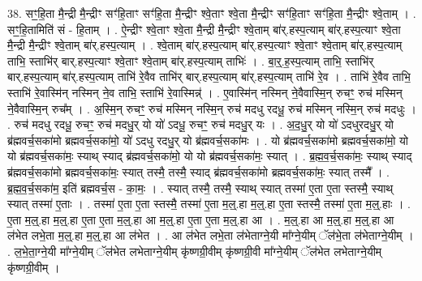\documentclass[17pt]{extarticle}
\begin{document}
38. सꣳ॒॒हि॒ता मै॒न्द्री मै॒न्द्रीꣳ सꣳ॑हि॒ताꣳ सꣳ॑हि॒ता मै॒न्द्रीꣳ श्वे॒ताꣳ श्वे॒ता मै॒न्द्रीꣳ सꣳ॑हि॒ताꣳ सꣳ॑हि॒ता मै॒न्द्रीꣳ श्वे॒ताम् । . सꣳ॒॒हि॒तामिति॑ सं - हि॒ताम् । . ऐ॒न्द्रीꣳ श्वे॒ताꣳ श्वे॒ता मै॒न्द्री मै॒न्द्रीꣳ श्वे॒ताम् बा॑र्.हस्प॒त्याम् बा॑र्.हस्प॒त्याꣳ श्वे॒ता मै॒न्द्री मै॒न्द्रीꣳ श्वे॒ताम् बा॑र्.हस्प॒त्याम् । . श्वे॒ताम् बा॑र्.हस्प॒त्याम् बा॑र्.हस्प॒त्याꣳ श्वे॒ताꣳ श्वे॒ताम् बा॑र्.हस्प॒त्याम् ताभि॒ स्ताभि॑र् बार्.हस्प॒त्याꣳ श्वे॒ताꣳ श्वे॒ताम् बा॑र्.हस्प॒त्याम् ताभिः॑ । . बा॒र्॒.ह॒स्प॒त्याम् ताभि॒ स्ताभि॑र् बार्.हस्प॒त्याम् बा॑र्.हस्प॒त्याम् ताभि॑ रे॒वैव ताभि॑र् बार्.हस्प॒त्याम् बा॑र्.हस्प॒त्याम् ताभि॑ रे॒व । . ताभि॑ रे॒वैव ताभि॒ स्ताभि॑ रे॒वास्मि॑न् नस्मिन् ने॒व ताभि॒ स्ताभि॑ रे॒वास्मिन्न्॑ । . ए॒वास्मि॑न् नस्मिन् ने॒वैवास्मि॒न् रुचꣳ॒॒ रुच॑ मस्मिन् ने॒वैवास्मि॒न् रुच᳚म् । . अ॒स्मि॒न् रुचꣳ॒॒ रुच॑ मस्मिन् नस्मि॒न् रुच॑ मदधु रदधू॒ रुच॑ मस्मिन् नस्मि॒न् रुच॑ मदधुः । . रुच॑ मदधु रदधू॒ रुचꣳ॒॒ रुच॑ मदधु॒र् यो यो॑ ऽदधू॒ रुचꣳ॒॒ रुच॑ मदधु॒र् यः । . अ॒द॒धु॒र् यो यो॑ ऽदधुरदधु॒र् यो ब्र॑ह्मवर्च॒सका॑मो ब्रह्मवर्च॒सका॑मो॒ यो॑ ऽदधु रदधु॒र् यो ब्र॑ह्मवर्च॒सका॑मः । . यो ब्र॑ह्मवर्च॒सका॑मो ब्रह्मवर्च॒सका॑मो॒ यो यो ब्र॑ह्मवर्च॒सका॑मः॒ स्याथ् स्याद् ब्र॑ह्मवर्च॒सका॑मो॒ यो यो ब्र॑ह्मवर्च॒सका॑मः॒ स्यात् । . ब्र॒ह्म॒व॒र्च॒सका॑मः॒ स्याथ् स्याद् ब्र॑ह्मवर्च॒सका॑मो ब्रह्मवर्च॒सका॑मः॒ स्यात् तस्मै॒ तस्मै॒ स्याद् ब्र॑ह्मवर्च॒सका॑मो ब्रह्मवर्च॒सका॑मः॒ स्यात् तस्मै᳚ । . ब्र॒ह्म॒व॒र्च॒सका॑म॒ इति॑ ब्रह्मवर्च॒स - का॒मः॒ । . स्यात् तस्मै॒ तस्मै॒ स्याथ् स्यात् तस्मा॑ ए॒ता ए॒ता स्तस्मै॒ स्याथ् स्यात् तस्मा॑ ए॒ताः । . तस्मा॑ ए॒ता ए॒ता स्तस्मै॒ तस्मा॑ ए॒ता म॒ल्॒.हा म॒ल्॒.हा ए॒ता स्तस्मै॒ तस्मा॑ ए॒ता म॒ल्॒.हाः । . ए॒ता म॒ल्॒.हा म॒ल्॒.हा ए॒ता ए॒ता म॒ल्॒.हा आ म॒ल्॒.हा ए॒ता ए॒ता म॒ल्॒.हा आ । . म॒ल्॒.हा आ म॒ल्॒.हा म॒ल्॒.हा आ ल॑भेत लभे॒ता म॒ल्॒.हा म॒ल्॒.हा आ ल॑भेत । . आ ल॑भेत लभे॒ता ल॑भेताग्ने॒यी मा᳚ग्ने॒यीम् ॅल॑भे॒ता ल॑भेताग्ने॒यीम् । . ल॒भे॒ता॒ग्ने॒यी मा᳚ग्ने॒यीम् ॅल॑भेत लभेताग्ने॒यीम् कृ॑ष्णग्री॒वीम् कृ॑ष्णग्री॒वी मा᳚ग्ने॒यीम् ॅल॑भेत लभेताग्ने॒यीम् कृ॑ष्णग्री॒वीम् । \newline
\pagebreak
{}
\end{document}
